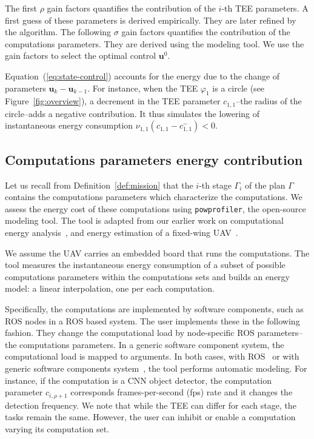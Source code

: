 \documentclass[letterpaper,10pt,conference]{ieeeconf}
\newcommand{\stt}[1]{{\small\tt #1}} %
\newcommand{\powprof}{\stt{powprofiler}}
\theoremstyle{definition}
\begin{document}
The first $\rho$ gain factors quantifies the contribution of the $i$-th TEE parameters. A first guess of these parameters is derived empirically. They are later refined by the algorithm. The following $\sigma$ gain factors quantifies the contribution of the computations parameters. They are derived using the modeling tool. We use the gain factors to select the optimal control $\mathbf{u}^0$. 

Equation~(\ref{eq:state-control}) accounts for the energy due to the change of parameters $\mathbf{u}_k-\mathbf{u}_{k-1}$. For instance, when the TEE $\varphi_1$ is a circle (see Figure~\ref{fig:overview}), a decrement in the TEE parameter $c_{1,1}$--the radius of the circle--adds a negative contribution. It thus simulates the lowering of instantaneous energy consumption $\nu_{1,1}(c_{1,1}-c_{1,1}^-)<0$. 

\subsection{Computations parameters energy contribution}
\label{sec:computations-model}

Let us recall from Definition~\ref{def:mission} that the $i$-th stage $\Gamma_i$ of the plan $\Gamma$ contains the computations parameters which characterize the computations. We assess the energy cost of these computations using \powprof{}, the open-source modeling tool. The tool is adapted from our earlier work on computational energy analysis~\cite{seewald2019coarse, seewald2019component}, and energy estimation of a fixed-wing UAV~\cite{seewald2020mechanical}. 

We assume the UAV carries an embedded board that runs the computations. The tool measures the instantaneous energy consumption of a subset of possible computations parameters within the computations sets and builds an energy model: a linear interpolation, one per each computation. 

Specifically, the computations are implemented by software components, such as ROS nodes in a ROS based system. The user implements these in the following fashion. They change the computational load by node-specific ROS parameters--the computations parameters. In a generic software component system, the computational load is mapped to arguments. In both cases, with ROS~\cite{zamanakos2020energy} or with generic software components system~\cite{seewald2019component}, the tool performs automatic modeling. For instance, if the computation is a CNN object detector, the computation parameter $c_{i,\rho+1}$ corresponds frames-per-second (fps) rate and it changes the detection frequency. We note that while the TEE can differ for each stage, the tasks remain the same. However, the user can inhibit or enable a computation varying its computation set.
\end{document}
